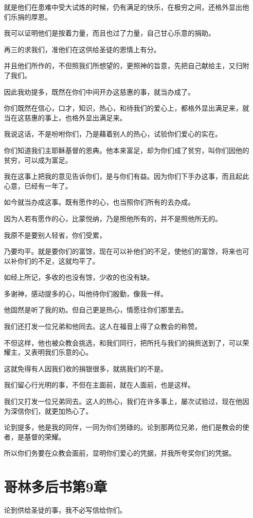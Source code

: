 \documentclass[12pt,oneside]{book}
\begin{document}
就是他们在患难中受大试炼的时候，仍有满足的快乐，在极穷之间，还格外显出他们乐捐的厚恩。

我可以证明他们是按着力量，而且也过了力量，自己甘心乐意的捐助。

再三的求我们，准他们在这供给圣徒的恩情上有分。

并且他们所作的，不但照我们所想望的，更照神的旨意，先把自己献给主，又归附了我们。

因此我劝提多，既然在你们中间开办这慈惠的事，就当办成了。

你们既然在信心，口才，知识，热心，和待我们的爱心上，都格外显出满足来，就当在这慈惠的事上，也格外显出满足来。

我说这话，不是吩咐你们，乃是藉着别人的热心，试验你们爱心的实在。

你们知道我们主耶稣基督的恩典。他本来富足，却为你们成了贫穷，叫你们因他的贫穷，可以成为富足。

我在这事上把我的意见告诉你们，是与你们有益。因为你们下手办这事，而且起此心意，已经有一年了。

如今就当办成这事。既有愿作的心，也当照你们所有的去办成。

因为人若有愿作的心，比蒙悦纳，乃是照他所有的，并不是照他所无的。

我原不是要别人轻省，你们受累，

乃要均平。就是要你们的富馀，现在可以补他们的不足，使他们的富馀，将来也可以补你们的不足，这就均平了。

如经上所记，多收的也没有馀，少收的也没有缺。

多谢神，感动提多的心，叫他待你们殷勤，像我一样。

他固然是听了我的劝。但自己更是热心，情愿往你们那里去。

我们还打发一位兄弟和他同去。这人在福音上得了众教会的称赞。

不但这样，他也被众教会挑选，和我们同行，把所托与我们的捐赀送到了，可以荣耀主，又表明我们乐意的心。

这就免得有人因我们收的捐银很多，就挑我们的不是。

我们留心行光明的事，不但在主面前，就在人面前，也是这样。

我们又打发一位兄弟同去。这人的热心，我们在许多事上，屡次试验过，现在他因为深信你们，就更加热心了。

论到提多，他是我的同伴，一同为你们劳碌的。论到那两位兄弟，他们是教会的使者，是基督的荣耀。

所以你们务要在众教会面前，显明你们爱心的凭据，并我所夸奖你们的凭据。

\chapter{哥林多后书第9章}
论到供给圣徒的事，我不必写信给你们。
\end{document}
